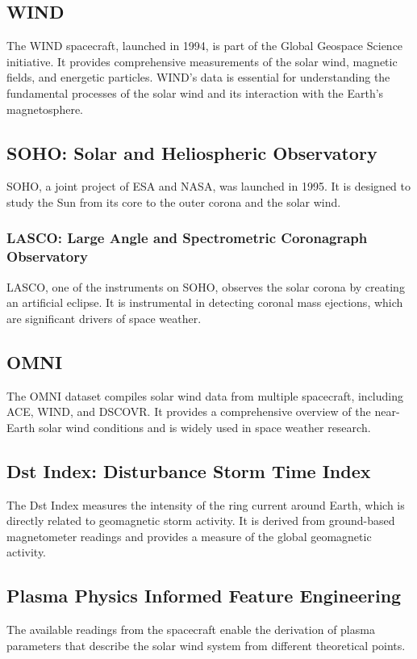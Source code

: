 \documentclass{article}
\begin{document}
\subsection{WIND}
The WIND spacecraft, launched in 1994, is part of the Global Geospace Science initiative. It provides comprehensive measurements of the solar wind, magnetic fields, and energetic particles. WIND's data is essential for understanding the fundamental processes of the solar wind and its interaction with the Earth's magnetosphere.

\subsection{SOHO: Solar and Heliospheric Observatory}
SOHO, a joint project of ESA and NASA, was launched in 1995. It is designed to study the Sun from its core to the outer corona and the solar wind.

\subsubsection{LASCO: Large Angle and Spectrometric Coronagraph Observatory}
LASCO, one of the instruments on SOHO, observes the solar corona by creating an artificial eclipse. It is instrumental in detecting coronal mass ejections, which are significant drivers of space weather.

\subsection{OMNI}
The OMNI dataset compiles solar wind data from multiple spacecraft, including ACE, WIND, and DSCOVR. It provides a comprehensive overview of the near-Earth solar wind conditions and is widely used in space weather research.

\subsection{Dst Index: Disturbance Storm Time Index}
The Dst Index measures the intensity of the ring current around Earth, which is directly related to geomagnetic storm activity. It is derived from ground-based magnetometer readings and provides a measure of the global geomagnetic activity.

\subsection{Plasma Physics Informed Feature Engineering}
The available readings from the spacecraft enable the derivation of plasma parameters that describe the solar wind system from different theoretical points.
\end{document}
